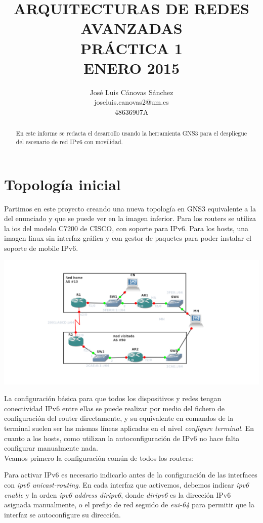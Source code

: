 \documentclass{article}
\author{José Luis Cánovas Sánchez\\joseluis.canovas2@um.es\\48636907A}
\title{ARQUITECTURAS DE REDES AVANZADAS\\PRÁCTICA 1\\ ENERO 2015}
\date{}
\begin{document}
\maketitle

\begin{abstract}
	En este informe se redacta el desarrollo usando la herramienta GNS3 para el despliegue del escenario de red IPv6 con movilidad.
\end{abstract}

\tableofcontents
\section{Topología inicial}
Partimos en este proyecto creando una nueva topología en GNS3 equivalente a la del enunciado y que se puede ver en la imagen inferior. Para los routers se utiliza la ios del modelo C7200 de CISCO, con soporte para IPv6. Para los hosts, una imagen linux sin interfaz gráfica y con gestor de paquetes para poder instalar el soporte de mobile IPv6.\par

\begin{center} 
	\includegraphics[scale=0.5]{images/topologyInic.png}
\end{center}

La configuración básica para que todos los dispositivos y redes tengan conectividad IPv6 entre ellas se puede realizar por medio del fichero de configuración del router directamente, y su equivalente en comandos de la terminal suelen ser las mismas líneas aplicadas en el nivel \textit{configure terminal}. En cuanto a los hosts, como utilizan la autoconfiguración de IPv6 no hace falta configurar manualmente nada.
\\

Veamos primero la configuración común de todos los routers:

Para activar IPv6 es necesario indicarlo antes de la configuración de las interfaces con \textit{ipv6 unicast-routing}. En cada interfaz que activemos, debemos indicar \textit{ipv6 enable} y la orden \textit{ipv6 address diripv6}, donde \textit{diripv6} es la dirección IPv6 asignada manualmente, o el prefijo de red seguido de \textit{eui-64} para permitir que la interfaz se autoconfigure su dirección.
\end{document}
